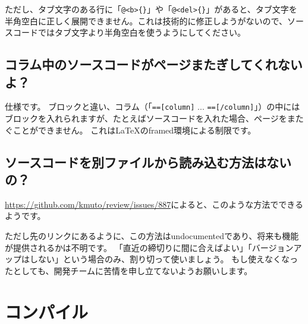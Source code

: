\noindent
{}

\starterresult
\begin{starterterminal}\end{starterterminal}
\endstarterresult

ただし、タブ文字のある行に「\texttt{@\textless{}b\textgreater{}\{\}}」や「\texttt{@\textless{}del\textgreater{}\{\}}」があると、タブ文字を半角空白に正しく展開できません。これは技術的に修正しようがないので、ソースコードではタブ文字より半角空白を使うようにしてください。

\subsection{コラム中のソースコードがページまたぎしてくれないよ？}
\label{sec:2-4-2}

仕様です。
ブロックと違い、コラム（「\texttt{==[column]} ... \texttt{==[/column]}」）の中にはブロックを入れられますが、たとえばソースコードを入れた場合、ページをまたぐことができません。
これは\LaTeX{}のframed環境による制限です。

\subsection{ソースコードを別ファイルから読み込む方法はないの？}
\label{sec:2-4-3}

\url{https://github.com/kmuto/review/issues/887}によると、このような方法でできるようです。

\label{}
\begin{starterprogram}\end{starterprogram}

ただし先のリンクにあるように、この方法はundocumentedであり、将来も機能が提供されるかは不明です。
「直近の締切りに間に合えばよい」「バージョンアップはしない」という場合のみ、割り切って使いましょう。
もし使えなくなったとしても、開発チームに苦情を申し立てないようお願いします。

\section{コンパイル}
\label{sec:2-5}

